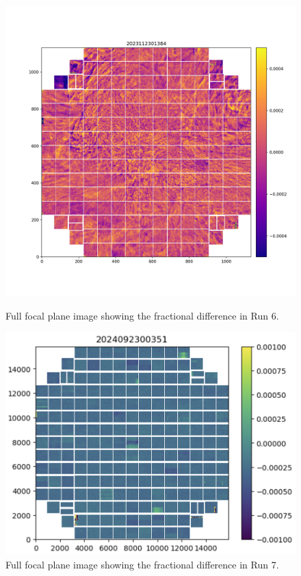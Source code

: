\begin{figure}[htbp]
\centering
\begin{minipage}{0.45\textwidth}
    \centering
    \includegraphics[width=\linewidth]{sections/figures/Run6_Weather.png}
    \caption{Full focal plane image showing the fractional difference in Run 6.}
\end{minipage}
\hfill
\begin{minipage}{0.45\textwidth}
    \centering
    \includegraphics[width=\linewidth]{sections/figures/Run7_WeatherDiffuser.png}
    \caption{Full focal plane image showing the fractional difference in Run 7.}
\end{minipage}
\end{figure}

